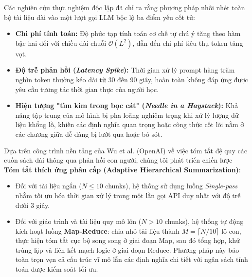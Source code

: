 ﻿\documentclass[12pt]{article}
\begin{document}
Các nghiên cứu thực nghiệm độc lập đã chỉ ra rằng phương pháp nhồi nhét toàn bộ tài liệu dài vào một lượt gọi LLM bộc lộ ba điểm yếu cốt tử:
\begin{itemize}
    \item \textbf{Chi phí tính toán:} Độ phức tạp tính toán cơ chế tự chú ý tăng theo hàm bậc hai đối với chiều dài chuỗi $\mathcal{O}(L^2)$, dẫn đến chi phí tiêu thụ token tăng vọt.
    \item \textbf{Độ trễ phản hồi (\textit{Latency Spike}):} Thời gian xử lý prompt hàng trăm nghìn token thường kéo dài từ 30 đến 90 giây, hoàn toàn không đáp ứng được yêu cầu tương tác thời gian thực của người học.
    \item \textbf{Hiện tượng "tìm kim trong bọc cát" (\textit{Needle in a Haystack}):} Khả năng tập trung của mô hình bị pha loãng nghiêm trọng khi xử lý lượng dữ liệu khổng lồ, khiến các định nghĩa quan trọng hoặc công thức cốt lõi nằm ở các chương giữa dễ dàng bị lướt qua hoặc bỏ sót.
\end{itemize}

Dựa trên công trình nền tảng của Wu et al. (OpenAI) \cite{wu2021recursive_summarize} về việc tóm tắt đệ quy các cuốn sách dài thông qua phản hồi con người, chúng tôi phát triển chiến lược \textbf{Tóm tắt thích ứng phân cấp (Adaptive Hierarchical Summarization)}:
\begin{itemize}
    \item Đối với tài liệu ngắn ($N \le 10$ chunks), hệ thống sử dụng luồng \textit{Single-pass} nhằm tối ưu hóa thời gian xử lý trong một lần gọi API duy nhất với độ trễ dưới 3 giây.
    \item Đối với giáo trình và tài liệu quy mô lớn ($N > 10$ chunks), hệ thống tự động kích hoạt luồng \textbf{Map-Reduce}: chia nhỏ tài liệu thành $M = \lceil N / 10 \rceil$ lô con, thực hiện tóm tắt cục bộ song song ở giai đoạn Map, sau đó tổng hợp, khử trùng lặp và liên kết mạch logic ở giai đoạn Reduce. Phương pháp này bảo toàn trọn vẹn cả cấu trúc vĩ mô lẫn các định nghĩa chi tiết với ngân sách tính toán được kiểm soát tối ưu.
\end{itemize}
\end{document}
